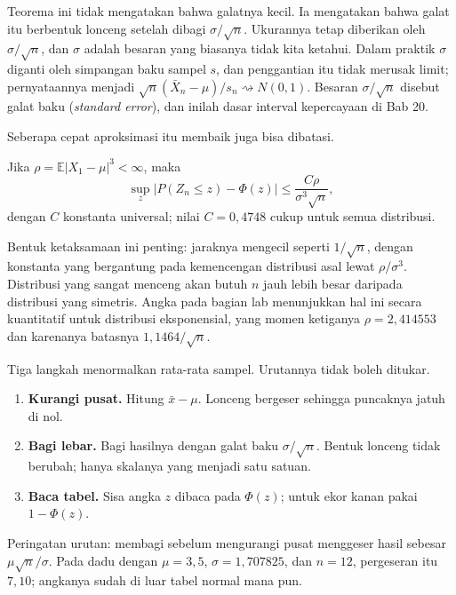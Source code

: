 Teorema ini tidak mengatakan bahwa galatnya kecil. Ia mengatakan bahwa galat itu
berbentuk lonceng setelah dibagi $\sigma/\sqrt n$. Ukurannya tetap diberikan oleh
$\sigma/\sqrt n$, dan $\sigma$ adalah besaran yang biasanya tidak kita ketahui.
Dalam praktik $\sigma$ diganti oleh simpangan baku sampel $s$, dan penggantian itu
tidak merusak limit; pernyataannya menjadi $\sqrt n(\bar X_n-\mu)/s_n
\rightsquigarrow N(0,1)$. Besaran $\sigma/\sqrt n$ disebut galat baku
 (\emph{standard error}), dan inilah dasar interval kepercayaan
di Bab 20.

Seberapa cepat aproksimasi itu membaik juga bisa dibatasi.

\begin{teorema}
Jika $\rho=\mathbb{E}|X_1-\mu|^3<\infty$, maka
\[
\sup_z\bigl|P(Z_n\le z)-\Phi(z)\bigr|\le \frac{C\rho}{\sigma^3\sqrt n},
\]
dengan $C$ konstanta universal; nilai $C=0{,}4748$ cukup untuk semua distribusi.
\end{teorema}

Bentuk ketaksamaan ini penting: jaraknya mengecil seperti $1/\sqrt n$, dengan
konstanta yang bergantung pada kemencengan distribusi asal lewat $\rho/\sigma^3$.
Distribusi yang sangat menceng akan butuh $n$ jauh lebih besar daripada
distribusi yang simetris. Angka pada bagian lab menunjukkan hal ini secara
kuantitatif untuk distribusi eksponensial, yang momen ketiganya $\rho=2{,}414553$
dan karenanya batasnya $1{,}1464/\sqrt n$.

\begin{resep}
Tiga langkah menormalkan rata-rata sampel. Urutannya tidak boleh ditukar.
\begin{enumerate}
\item \textbf{Kurangi pusat.} Hitung $\bar x-\mu$. Lonceng bergeser sehingga
      puncaknya jatuh di nol.
\item \textbf{Bagi lebar.} Bagi hasilnya dengan galat baku $\sigma/\sqrt n$.
      Bentuk lonceng tidak berubah; hanya skalanya yang menjadi satu satuan.
\item \textbf{Baca tabel.} Sisa angka $z$ dibaca pada $\Phi(z)$; untuk ekor
      kanan pakai $1-\Phi(z)$.
\end{enumerate}
Peringatan urutan: membagi sebelum mengurangi pusat menggeser hasil sebesar
$\mu\sqrt n/\sigma$. Pada dadu dengan $\mu=3{,}5$, $\sigma=1{,}707825$, dan
$n=12$, pergeseran itu $7{,}10$; angkanya sudah di luar tabel normal mana pun.
\end{resep}

